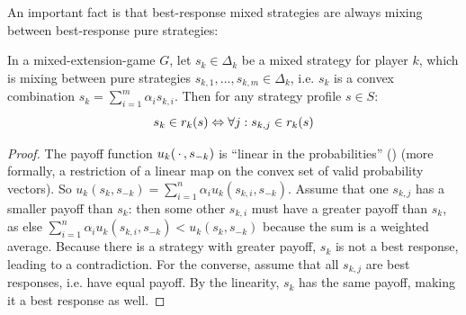 \documentclass[a4paper]{scrreprt}
\begin{document}
    An important fact is that best-response mixed strategies are always mixing between best-response pure strategies:

    \begin{thm}
        \label{thm:bestResponseMixing}
        In a mixed-extension-game $G$,
        let $s_k \in \Delta_k$ be a mixed strategy for player $k$, which is mixing between pure strategies $s_{k,1}, \dots, s_{k,m} \in \Delta_k$, i.e.
        $s_k$ is a convex combination $s_k = \sum_{i=1}^m \alpha_i s_{k, i}$.
        Then for any strategy profile $s \in S$:
        \[
            s_k \in r_k(s) \Leftrightarrow \forall j: s_{k, j} \in r_k(s)
        \]
    \end{thm}
    \begin{proof}
        The payoff function $u_k(\,\cdot\,, s_{-k})$ is “linear in the probabilities” (\cite[p.11]{bib:fudenbergGameTheory})
        (more formally, a restriction of a linear map on the convex set of valid probability vectors).
        So $u_k(s_k, s_{-k}) = \sum_{i=1}^n \alpha_i u_k(s_{k, i}, s_{-k})$.
        Assume that one $s_{k, j}$ has a smaller payoff than $s_k$: then some other $s_{k, i}$ must have a greater payoff than $s_k$, as else $\sum_{i=1}^n \alpha_i u_k(s_{k, i}, s_{-k}) < u_k(s_k, s_{-k})$ because the sum is a weighted average.
        Because there is a strategy with greater payoff, $s_k$ is not a best response, leading to a contradiction.
        For the converse, assume that all $ s_{k, j} $ are best responses, i.e. have equal payoff. By the linearity, $s_k$ has the same payoff, making it a best response as well.
    \end{proof}
\end{document}
